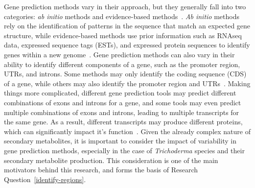 Gene prediction methods vary in their approach, but they generally fall into two categories: \textit{ab initio} methods and evidence-based methods~\cite{ejigu2020a}. \textit{Ab initio} methods rely on the identification of patterns in the sequence that match an expected gene structure, while evidence-based methods use prior information such as RNAseq data, expressed sequence tags (ESTs), and expressed protein sequences to identify genes within a new genome~\cite{ejigu2020a}. Gene prediction methods can also vary in their ability to identify different components of a gene, such as the promoter region, UTRs, and introns. Some methods may only identify the coding sequence (CDS) of a gene, while others may also identify the promoter region and UTRs~\cite{ejigu2020a}. Making things more complicated, different gene prediction tools may predict different combinations of exons and introns for a gene, and some tools may even predict multiple combinations of exons and introns, leading to multiple transcripts for the same gene. As a result, different transcripts may produce different proteins, which can significantly impact it's function~\cite{ejigu2020a}. Given the already complex nature of secondary metabolites, it is important to consider the impact of variability in gene prediction methods, especially in the case of \textit{Trichoderma} species and their secondary metabolite production. This consideration is one of the main motivators behind this research, and forms the basis of Research Question~\ref{identify-regions}.

